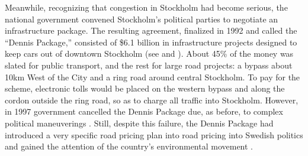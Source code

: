 Meanwhile, recognizing that congestion in Stockholm had become serious, the national government convened Stockholm's political parties to negotiate an infrastructure package. The resulting agreement, finalized in 1992 and called the ``Dennis Package,''  consisted of \$6.1 billion in infrastructure projects designed to keep cars out of downtown Stockholm (see \citet[pp. 39-40]{Gomez-Ibanez1994} and \citet[p. 92]{Hau1992}). About 45\% of the money was slated for public transport, and the rest for large road projects: a bypass about 10km West of the City and a ring road around central Stockholm. To pay for the scheme, electronic tolls would be placed on the western bypass and along the cordon outside the ring road, so as to charge all traffic into Stockholm. However, in 1997 government cancelled the Dennis Package due, as before, to complex political maneuverings \citep{Ahlstrand2001,GullbergIsaksson2009}. Still, despite this failure, the Dennis Package had introduced a very specific road pricing plan into road pricing into Swedish politics and gained the attention of the country's environmental movement \citep[p.3]{Eliasson2014b}.

